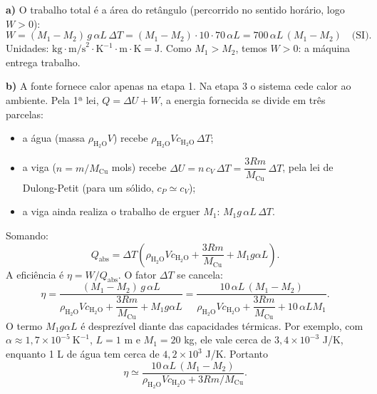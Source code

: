 \documentclass{article}%
\begin{document}
\begin{center}
\end{center}

\textbf{a)} O trabalho total é a área do retângulo (percorrido no sentido horário, logo $W>0$):
\[
W = (M_1-M_2)\,g\,\alpha L\,\Delta T = (M_1-M_2)\cdot 10\cdot 70\,\alpha L = 700\,\alpha L\,(M_1-M_2)\quad\text{(SI)} .
\]
Unidades: $\text{kg}\cdot\text{m/s}^2\cdot\text{K}^{-1}\cdot\text{m}\cdot\text{K}=\text{J}$. Como $M_1>M_2$, temos $W>0$: a máquina entrega trabalho.

\textbf{b)} A fonte fornece calor apenas na etapa 1. Na etapa 3 o sistema cede calor ao ambiente. Pela 1ª lei, $Q=\Delta U+W$, a energia fornecida se divide em três parcelas:
\begin{itemize}
\item a água (massa $\rho_{\text{H}_2\text{O}}V$) recebe $\rho_{\text{H}_2\text{O}}V c_{\text{H}_2\text{O}}\,\Delta T$;
\item a viga ($n=m/M_{\text{Cu}}$ mols) recebe $\Delta U = n\,c_V\,\Delta T = \dfrac{3Rm}{M_{\text{Cu}}}\,\Delta T$, pela lei de Dulong-Petit (para um sólido, $c_P\simeq c_V$);
\item a viga ainda realiza o trabalho de erguer $M_1$: $M_1 g\,\alpha L\,\Delta T$.
\end{itemize}
Somando:
\[
Q_{\text{abs}} = \Delta T\left(\rho_{\text{H}_2\text{O}}V c_{\text{H}_2\text{O}} + \frac{3Rm}{M_{\text{Cu}}} + M_1 g\alpha L\right).
\]
A eficiência é $\eta = W/Q_{\text{abs}}$. O fator $\Delta T$ se cancela:
\[
\eta = \frac{(M_1-M_2)\,g\,\alpha L}{\rho_{\text{H}_2\text{O}}V c_{\text{H}_2\text{O}} + \dfrac{3Rm}{M_{\text{Cu}}} + M_1 g\alpha L}
= \frac{10\,\alpha L\,(M_1-M_2)}{\rho_{\text{H}_2\text{O}}V c_{\text{H}_2\text{O}} + \dfrac{3Rm}{M_{\text{Cu}}} + 10\,\alpha L M_1}.
\]
O termo $M_1 g\alpha L$ é desprezível diante das capacidades térmicas. Por exemplo, com $\alpha\approx 1{,}7\times10^{-5}\ \text{K}^{-1}$, $L=1$ m e $M_1=20$ kg, ele vale cerca de $3{,}4\times10^{-3}$ J/K, enquanto 1 L de água tem cerca de $4{,}2\times10^{3}$ J/K. Portanto
\[
\eta \simeq \frac{10\,\alpha L\,(M_1-M_2)}{\rho_{\text{H}_2\text{O}}V c_{\text{H}_2\text{O}} + 3Rm/M_{\text{Cu}}} .
\]
\end{document}
